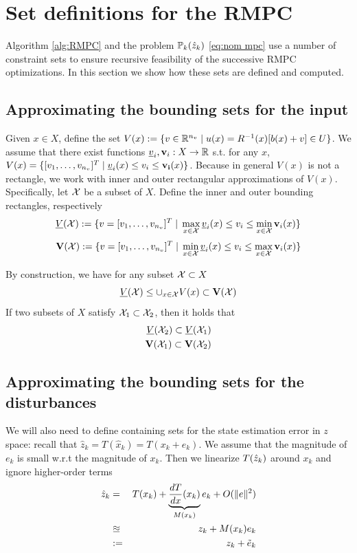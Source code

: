 \section{Set definitions for the RMPC}

Algorithm \ref{alg:RMPC} and the problem $\mathbb{P}_{k}(\hat{z}_{k})$ \eqref{eq:nom mpc} use a number of constraint sets to ensure recursive feasibility of the successive RMPC optimizations.
In this section we show how these sets are defined and computed.

\subsection{Approximating the bounding sets for the input}
\label{sec:approx input sets}
Given $x \in X$, define the set $V(x) := \{v \in \mathbb{R}^{n_v} \;|\; u(x) = R^{-1}(x)[b(x)+v] \in U\}$.
We assume that there exist functions $\underline{v}_i, \mathbf{v}_i: X \rightarrow \mathbb{R}$ s.t. for any $x$, $V(x) = \{[v_1,\ldots,v_{n_v}]^T \;|\; \underline{v}_i(x) \leq v_i \leq \mathbf{v_i}(x) \}$.
Because in general $V(x)$ is not a rectangle, we work with inner and outer rectangular approximations of $V(x)$.
Specifically, let $\mathcal{X}$ be a subset of $X$.
Define the inner and outer bounding rectangles, respectively
\[\underline{V}(\mathcal{X}) := \{v=[v_1,\ldots,v_{n_v}]^T \;|\; \max_{x\in \mathcal{X}} \underline{v}_i(x)  \leq v_i \leq \min_{x \in \mathcal{X}} \mathbf{v}_i(x) \} \]
\[\mathbf{V}(\mathcal{X}) := \{v=[v_1,\ldots,v_{n_v}]^T \;|\; \min_{x\in \mathcal{X}} \underline{v}_i(x)  \leq v_i \leq \max_{x \in \mathcal{X}} \mathbf{v}_i(x) \} \]

By construction, we have for any subset $\mathcal{X} \subset X$
\begin{equation}
\label{eq:Vbounds}
\underline{V}(\mathcal{X}) \leq \cup_{x \in \mathcal{X}} V(x) \subset \mathbf{V}(\mathcal{X})
\end{equation}
If two subsets of $X$ satisfy $\mathcal{X}_1 \subset \mathcal{X}_2$, then it holds that 
\begin{eqnarray}
\label{eq:V inclusions}
\underline{V}(\mathcal{X}_2) \subset \underline{V}(\mathcal{X}_1)
\nonumber
\\
\mathbf{V}(\mathcal{X}_1) \subset \mathbf{V}(\mathcal{X}_2)
\end{eqnarray}


\subsection{Approximating the bounding sets for the disturbances}
\label{sec:approx dist}
We will also need to define containing sets for the state estimation error in $z$ space:
recall that $\hat{z}_k = T(\hat{x}_k) = T(x_k+e_k)$. We assume that the magnitude of $e_k$ is small w.r.t the magnitude of $x_k$. 
Then we linearize $T(\hat{z}_{k})$ around $x_k$ and ignore higher-order terms
\begin{eqnarray}
\label{eq:err_lin}
\hat{z}_k &=& T(x_k) + \underbrace{\frac{dT}{dx}(x_k)}_{M(x_k)}e_k+ O(\|e\|^2) \nonumber 
\\
&\approxeq & z_k + M(x_k)e_k  \nonumber
\\
&:= & z_k + \tilde{e}_k  \nonumber
\end{eqnarray}

